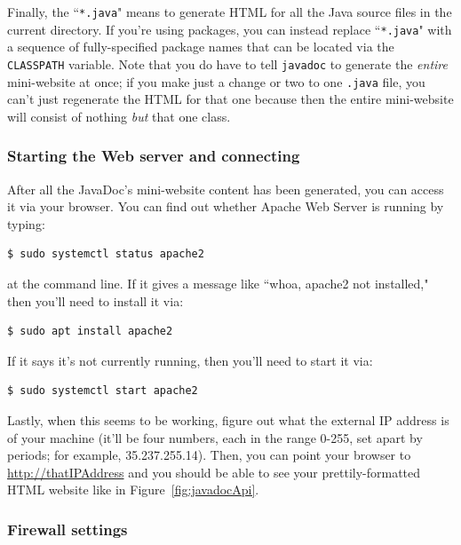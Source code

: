 Finally, the ``\texttt{*.java}" means to generate HTML for all the Java source
files in the current directory. If you're using packages, you can instead
replace ``\texttt{*.java}" with a sequence of fully-specified package names
that can be located via the \texttt{CLASSPATH} variable. Note that you
do have to tell \texttt{javadoc} to generate the \textit{entire} mini-website
at once; if you make just a change or two to one \texttt{.java} file, you
can't just regenerate the HTML for that one because then the entire
mini-website will consist of nothing \textit{but} that one class.

\subsubsection{Starting the Web server and connecting}

After all the JavaDoc's mini-website content has been generated, you can
access it via your browser. You can find out whether Apache Web Server is
running by typing:

\begin{Verbatim}[fontsize=\small,samepage=true,frame=none]
$ sudo systemctl status apache2
\end{Verbatim}

at the command line. If it gives a message like ``whoa, apache2 not
installed," then you'll need to install it via:

\begin{Verbatim}[fontsize=\small,samepage=true,frame=none]
$ sudo apt install apache2
\end{Verbatim}

If it says it's not currently running, then you'll need to start it via:

\begin{Verbatim}[fontsize=\small,samepage=true,frame=none]
$ sudo systemctl start apache2
\end{Verbatim}

Lastly, when this seems to be working, figure out what the external IP address
is of your machine (it'll be four numbers, each in the range 0-255, set apart
by periods; for example, 35.237.255.14). Then, you can point your browser to
\url{http://thatIPAddress} and you should be able to see your
prettily-formatted HTML website like in Figure~\ref{fig:javadocApi}.

\subsubsection{Firewall settings}

